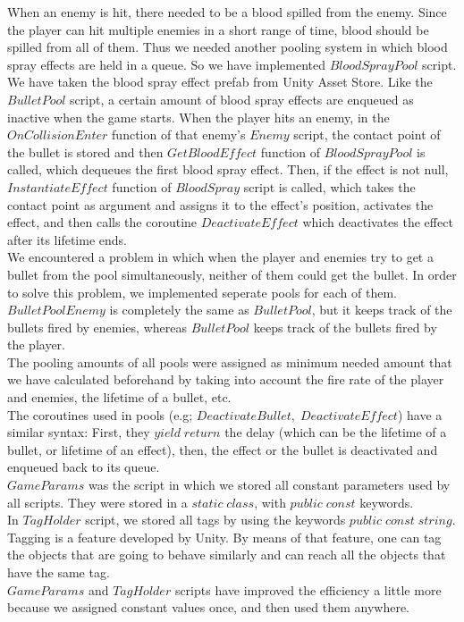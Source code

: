 \documentclass[a4paper]{article}
\begin{document}
\begin{minipage}{\dimexpr\textwidth-1cm}
\hspace{0.5cm}
When an enemy is hit, there needed to be a blood spilled from the enemy. Since the player can hit multiple enemies in a short range of time, blood should be spilled from all of them. Thus we needed another pooling system in which blood spray effects are held in a queue. So we have implemented $BloodSprayPool$ script. We have taken the blood spray effect prefab from Unity Asset Store. Like the $BulletPool$ script, a certain amount of blood spray effects are enqueued as inactive when the game starts. When the player hits an enemy, in the $OnCollisionEnter$ function of that enemy's $Enemy$ script, the contact point of the bullet is stored and then $GetBloodEffect$ function of $BloodSprayPool$ is called, which dequeues the first blood spray effect. Then, if the effect is not null, $InstantiateEffect$ function of $BloodSpray$ script is called, which takes the contact point as argument and assigns it to the effect's position, activates the effect, and then calls the coroutine $DeactivateEffect$ which deactivates the effect after its lifetime ends.\\
We encountered a problem in which when the player and enemies try to get a bullet from the pool simultaneously, neither of them could get the bullet. In order to solve this problem, we implemented seperate pools for each of them. $BulletPoolEnemy$ is completely the same as $BulletPool$, but it keeps track of the bullets fired by enemies, whereas $BulletPool$ keeps track of the bullets fired by the player.\\
The pooling amounts of all pools were assigned as minimum needed amount that we have calculated beforehand by taking into account the fire rate of the player and enemies, the lifetime of a bullet, etc.\\
\hspace{0.5cm} The coroutines used in pools (e.g; $DeactivateBullet,\; DeactivateEffect$) have a similar syntax: First, they $yield \; return$ the delay (which can be the lifetime of a bullet, or lifetime of an effect), then, the effect or the bullet is deactivated and enqueued back to its queue.\\
$GameParams$ was the script in which we stored all constant parameters used by all scripts. They were stored in a $static \; class$, with $public \; const$ keywords.\\
In $TagHolder$ script, we stored all tags by using the keywords $public \; const \; string$. Tagging is a feature developed by Unity. By means of that feature, one can tag the objects that are going to behave similarly and can reach all the objects that have the same tag.\\
$GameParams$ and $TagHolder$ scripts have improved the efficiency a little more because we assigned constant values once, and then used them anywhere.\\
\end{minipage}
\end{document}
